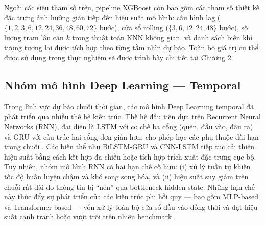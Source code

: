 Ngoài các siêu tham số trên, pipeline XGBoost còn bao gồm các tham số thiết kế đặc trưng  ảnh hưởng gián tiếp đến hiệu suất mô hình: cấu hình lag ($\{1, 2, 3, 6, 12, 24, 36, 48, 60, 72\}$ bước), cửa sổ rolling ($\{3, 6, 12, 24, 48\}$ bước), số lượng trạm lân cận $k$ trong thuật toán KNN không gian, và danh sách biến khí tượng tương lai được tích hợp theo từng tầm nhìn dự báo. Toàn bộ giá trị cụ thể được sử dụng trong thực nghiệm sẽ được trình bày chi tiết tại Chương 2.



\subsection{Nhóm mô hình Deep Learning — Temporal}
Trong lĩnh vực dự báo chuỗi thời gian, các mô hình Deep Learning temporal đã phát triển qua nhiều thế hệ kiến trúc. Thế hệ đầu tiên dựa trên Recurrent Neural Networks (RNN), đại diện là LSTM với cơ chế ba cổng (quên, đầu vào, đầu ra) và GRU với cấu trúc hai cổng đơn giản hơn, cho phép học các phụ thuộc dài hạn trong chuỗi \cite{silveira2025lstmgru}. Các biến thể như BiLSTM-GRU \cite{he2024bilstmgru} và CNN-LSTM \cite{zhang2025cnnlstm} tiếp tục cải thiện hiệu suất bằng cách kết hợp đa chiều hoặc tích hợp trích xuất đặc trưng cục bộ. Tuy nhiên, nhóm mô hình RNN có hai hạn chế cố hữu: (i) xử lý tuần tự khiến tốc độ huấn luyện chậm và khó song song hóa, và (ii) hiệu suất suy giảm trên chuỗi rất dài do thông tin bị ``nén'' qua bottleneck hidden state. Những hạn chế này thúc đẩy sự phát triển của các kiến trúc phi hồi quy — bao gồm MLP-based và Transformer-based — vốn xử lý toàn bộ cửa sổ đầu vào đồng thời và đạt hiệu suất cạnh tranh hoặc vượt trội trên nhiều benchmark.
